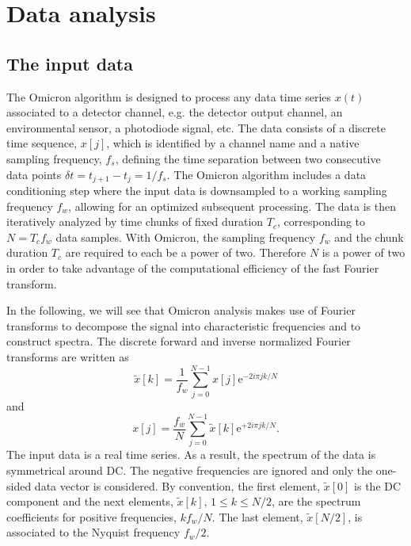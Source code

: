 \section{Data analysis} \label{sec:analysis}

\subsection{The input data} \label{sec:analysis:data}

The Omicron algorithm is designed to process any data time series $x(t)$ associated to a detector channel, e.g. the detector output channel, an environmental sensor, a photodiode signal, etc. The data consists of a discrete time sequence, $x[j]$, which is identified by a channel name and a native sampling frequency, $f_s$, defining the time separation between two consecutive data points $\delta t = t_{j+1}-t_j = 1/f_s$. The Omicron algorithm includes a data conditioning step where the input data is downsampled to a working sampling frequency $f_w$, allowing for an optimized subsequent processing. The data is then iteratively analyzed by time chunks of fixed duration $T_c$, corresponding to $N=T_cf_w$ data samples. With Omicron, the sampling frequency $f_w$ and the chunk duration $T_c$ are required to each be a power of two. Therefore $N$ is a power of two in order to take advantage of the computational efficiency of the fast Fourier transform.

In the following, we will see that Omicron analysis makes use of Fourier transforms to decompose the signal into characteristic frequencies and to construct spectra. The discrete forward and inverse normalized Fourier transforms are written as
\begin{equation}
  \tilde{x}[k]=\frac{1}{f_w}\sum_{j=0}^{N-1}{x[j]\mathrm{e}^{-2i\pi jk/N}}
\end{equation}
and
\begin{equation}
  x[j]=\frac{f_w}{N}\sum_{j=0}^{N-1}{\tilde{x}[k]\mathrm{e}^{+2i\pi jk/N}}.
\end{equation}
The input data is a real time series. As a result, the spectrum of the data is symmetrical around DC. The negative frequencies are ignored and only the one-sided data vector is considered. By convention, the first element, $\tilde{x}[0]$ is the DC component and the next elements, $\tilde{x}[k]$, $1\le k \le N/2$, are the spectrum coefficients for positive frequencies, $kf_w/N$. The last element, $\tilde{x}[N/2]$, is associated to the Nyquist frequency $f_w/2$. 

